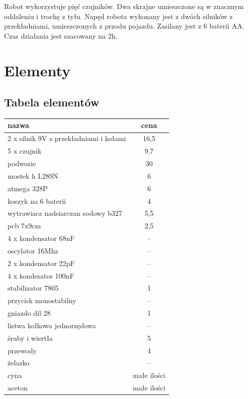 \documentclass[a4paper,11pt]{article}
\begin{document}
Robot wykorzystuje pięć czujników. Dwa skrajne umieszczone są w znacznym oddaleniu i trochę z tyłu.
Napęd robota wykonany jest z dwóch silników z przekładniami, umieszczonych z przodu pojazdu. Zasilany jest z 6 baterii AA. Czas działania jest szacowany na 2h.
\section{Elementy}
\subsection{Tabela elementów}

\begin{center}

\begin{tabular}{|l | c|}

	\hline
	nazwa 										& cena			\\ \hline
	2 x silnik 9V z przekładniami i kołami 		& 16,5			\\
	5 x czujnik									& 9,7			\\
	podwozie										& 30				\\
	mostek h L289N								& 6				\\
	atmega 328P									& 6				\\
	koszyk na 6 baterii							& 4				\\
	wytrawiacz nadsiarczan sodowy b327			& 5,5			\\
	pcb	7x9cm									& 2,5			\\
	4 x kondensator 68nF							& --				\\
	oscylator 16Mhz								& --				\\
	2 x kondensator 22pF							& --				\\
	4 x kondesator 100nF							& --				\\
	stabilizator 7805							& 1				\\
	przycisk monostabilny						& --				\\
	gniazdo dil 28								& 1				\\
	listwa kołkowa jednorzędowa					& --				\\
	śruby i wiertła								& 5				\\
	przewody										& 4				\\
	żelazko										& --				\\
	cyna											& małe ilości	\\
	aceton										& małe ilości	\\
	\hline
\end{tabular}

\end{center}
\end{document}
